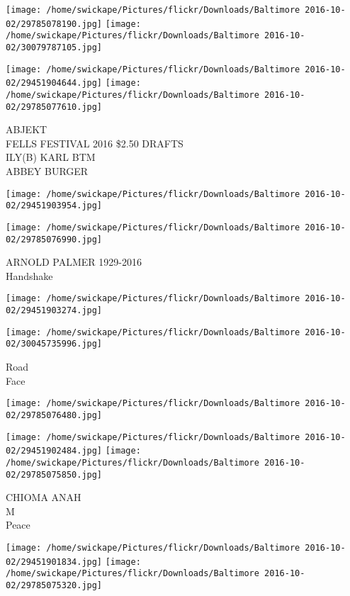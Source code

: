 \documentclass[10pt,letterpaper]{article}
\begin{document}
\texttt{[image: /home/swickape/Pictures/flickr/Downloads/Baltimore 2016-10-02/29785078190.jpg]}
\texttt{[image: /home/swickape/Pictures/flickr/Downloads/Baltimore 2016-10-02/30079787105.jpg]}

\texttt{[image: /home/swickape/Pictures/flickr/Downloads/Baltimore 2016-10-02/29451904644.jpg]}
\texttt{[image: /home/swickape/Pictures/flickr/Downloads/Baltimore 2016-10-02/29785077610.jpg]}

ABJEKT\\
FELLS FESTIVAL 2016 \$2.50 DRAFTS\\
ILY(B) KARL BTM\\
ABBEY BURGER
\pagebreak

\texttt{[image: /home/swickape/Pictures/flickr/Downloads/Baltimore 2016-10-02/29451903954.jpg]}

\vspace{0.25in}
\texttt{[image: /home/swickape/Pictures/flickr/Downloads/Baltimore 2016-10-02/29785076990.jpg]}

ARNOLD PALMER 1929{-}2016\\
Handshake
\pagebreak

\texttt{[image: /home/swickape/Pictures/flickr/Downloads/Baltimore 2016-10-02/29451903274.jpg]}

\vspace{0.25in}
\texttt{[image: /home/swickape/Pictures/flickr/Downloads/Baltimore 2016-10-02/30045735996.jpg]}

Road\\
Face
\pagebreak

\texttt{[image: /home/swickape/Pictures/flickr/Downloads/Baltimore 2016-10-02/29785076480.jpg]}

\vspace{0.25in}
\texttt{[image: /home/swickape/Pictures/flickr/Downloads/Baltimore 2016-10-02/29451902484.jpg]}
\texttt{[image: /home/swickape/Pictures/flickr/Downloads/Baltimore 2016-10-02/29785075850.jpg]}

CHIOMA ANAH\\
M\\
Peace
\pagebreak

\texttt{[image: /home/swickape/Pictures/flickr/Downloads/Baltimore 2016-10-02/29451901834.jpg]}
\texttt{[image: /home/swickape/Pictures/flickr/Downloads/Baltimore 2016-10-02/29785075320.jpg]}
\end{document}
